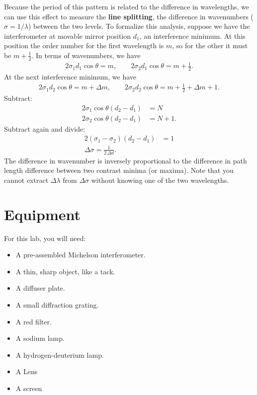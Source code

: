 \documentclass[]{manual}
\begin{document}
    Because the period of this pattern is related to the difference in wavelengths, we can use this effect to measure the \textbf{line splitting}, the difference in wavenumbers ($\sigma = 1/\lambda$) between the two levels.
    To formalize this analysis, suppose we have the interferometer at movable mirror position $d_1$, an interference minimum.
    At this position the order number for the first wavelength is $m$, so for the other it must be $m+\frac{1}{2}$.
    In terms of wavenumbers, we have
    \begin{align}
        2\sigma_1 d_1 \cos{\theta} = m, \qquad 2\sigma_2 d_1 \cos{\theta} = m + \frac{1}{2}.
    \end{align}
    At the next interference minimum, we have
    \begin{align}
        2\sigma_1 d_2 \cos{\theta} = m + \Delta m, \qquad 2\sigma_2 d_2 \cos{\theta} = m + \frac{1}{2} + \Delta m + 1.
    \end{align}
    Subtract:
    \begin{align}
        2\sigma_1 \cos{\theta} \left(d_2-d_1\right) &= N \\
        2\sigma_2 \cos{\theta} \left(d_2-d_1\right) &= N + 1.
    \end{align}
    Subtract again and divide:
    \begin{align}
        2\left(\sigma_1 - \sigma_2\right)\left(d_2-d_1\right) &= 1 \\
        \Delta \sigma = \frac{1}{2 \, \Delta d}.
    \end{align}
    The difference in wavenumber is inversely proportional to the difference in path length difference between two contrast minima (or maxima).
    Note that you cannot extract $\Delta \lambda$ from $\Delta \sigma$ without knowing one of the two wavelengths.

    \section{Equipment}


    For this lab, you will need:
    \begin{itemize}
        \item A pre-assembled Michelson interferometer.
        \item A thin, sharp object, like a tack.
        \item A diffuser plate.
        \item A small diffraction grating.
        \item A red filter.
        \item A sodium lamp.
        \item A hydrogen-deuterium lamp.
        \item A Lens
        \item A screen
    \end{itemize}
\end{document}
